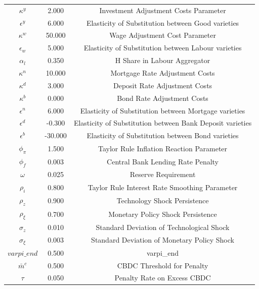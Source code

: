 \begin{center}
\begin{longtable}{ccc}
$\kappa^y$ 	 & 	 2.000 	 & 	 Investment Adjustment Costs Parameter\\
$\epsilon^y$ 	 & 	 6.000 	 & 	 Elasticity of Substitution between Good varieties\\
$\kappa^w$ 	 & 	 50.000 	 & 	 Wage Adjustment Cost Parameter\\
$\epsilon_w$ 	 & 	 5.000 	 & 	 Elasticity of Substitution between Labour varieties\\
$\alpha_l$ 	 & 	 0.350 	 & 	 H Share in Labour Aggregator\\
$\kappa^n$ 	 & 	 10.000 	 & 	 Mortgage Rate Adjustment Costs\\
$\kappa^d$ 	 & 	 3.000 	 & 	 Deposit Rate Adjustment Costs\\
$\kappa^b$ 	 & 	 0.000 	 & 	 Bond Rate Adjustment Costs\\
$\epsilon^n$ 	 & 	 6.000 	 & 	 Elasticity of Substitution between Mortgage varieties\\
$\epsilon^d$ 	 & 	 -0.300 	 & 	 Elasticity of Substitution between Bank Deposit varieties\\
$\epsilon^b$ 	 & 	 -30.000 	 & 	 Elasticity of Substitution between Bond varieties\\
$\phi_\pi$ 	 & 	 1.500 	 & 	 Taylor Rule Inflation Reaction Parameter\\
$\phi_f$ 	 & 	 0.003 	 & 	 Central Bank Lending Rate Penalty\\
$\omega$ 	 & 	 0.025 	 & 	 Reserve Requirement\\
$\rho_i$ 	 & 	 0.800 	 & 	 Taylor Rule Interest Rate Smoothing Parameter\\
$\rho_z$ 	 & 	 0.900 	 & 	 Technology Shock Persistence\\
$\rho_\xi$ 	 & 	 0.700 	 & 	 Monetary Policy Shock Persistence\\
$\sigma_z$ 	 & 	 0.010 	 & 	 Standard Deviation of Technological Shock\\
$\sigma_\xi$ 	 & 	 0.003 	 & 	 Standard Deviation of Monetary Policy Shock\\
$varpi\_end$ 	 & 	 0.500 	 & 	 varpi\_end\\
$\bar{m}^c$ 	 & 	 0.500 	 & 	 CBDC Threshold for Penalty\\
$\tau$ 	 & 	 0.050 	 & 	 Penalty Rate on Excess CBDC\\
\bottomrule%
\end{longtable}
\end{center}
